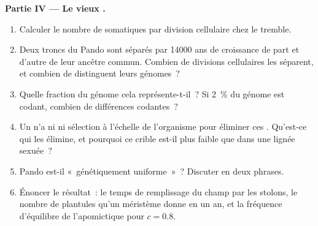 \begin{problem}
\medskip
\noindent\textbf{Partie IV --- Le vieux .}
\begin{enumerate}[resume]
  \item Calculer le nombre de  somatiques par division
        cellulaire chez le tremble.
  \item Deux troncs du  Pando sont séparés par \num{14000} ans de
        croissance de part et d'autre de leur ancêtre commun. Combien de
        divisions cellulaires les séparent, et combien de 
        distinguent leurs génomes~?
  \item Quelle fraction du génome cela représente-t-il~? Si
        \qty{2}{\%} du génome est codant, combien de différences
        codantes~?
  \item Un  n'a ni  ni sélection à l'échelle de l'organisme
        pour éliminer ces . Qu'est-ce qui les élimine, et
        pourquoi ce crible est-il plus faible que dans une lignée
        sexuée~?
  \item Pando est-il «~génétiquement uniforme~»~? Discuter en deux
        phrases.
  \item Énoncer le résultat~: le temps de remplissage du champ par les
        stolons, le nombre de plantules qu'un méristème donne en un an,
        et la fréquence d'équilibre de l'apomictique pour $c = 0.8$.
\end{enumerate}
\end{problem}

